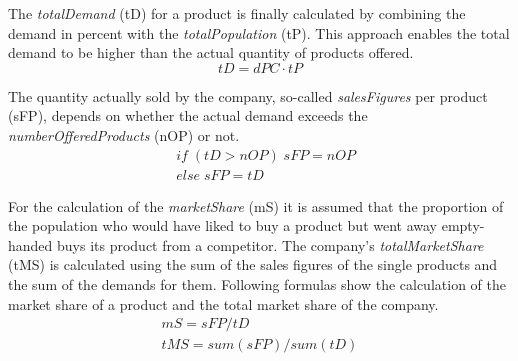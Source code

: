 The \textit{totalDemand} (\gls{tD}) for a product is finally calculated by combining the demand in percent with the \textit{totalPopulation} (\gls{tP}). This approach enables the total demand to be higher than the actual quantity of products offered.
\begin{equation}
\label{func:totalDemand}
tD= dPC \cdot tP    
\end{equation}

The quantity actually sold by the company, so-called \textit{salesFigures} per product (\gls{sFP}), depends on whether the actual demand exceeds the \textit{numberOfferedProducts} (\gls{nOP}) or not.
\begin{equation}
\label{func:salesFigure}
\begin{aligned}
& if \; ( tD > nOP ) \; { sFP = nOP } \\
& else \; { sFP = tD }    
\end{aligned}
\end{equation}

For the calculation of the \textit{marketShare} (\gls{mS}) it is assumed that the proportion of the population who would have liked to buy a product but went away empty-handed buys its product from a competitor. The company's \textit{totalMarketShare} (\gls{tMS}) is calculated using the sum of the sales figures of the single products and the sum of the demands for them. Following formulas show the calculation of the market share of a product and the total market share of the company.  
\begin{equation}
\label{func:marketShare}
\begin{aligned}
mS = sFP / tD \\
tMS = sum(sFP) / sum(tD)   
\end{aligned}
\end{equation}

